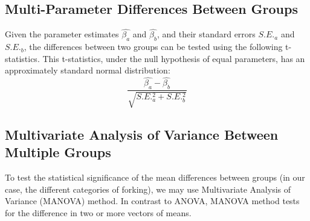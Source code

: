 \documentclass[12pt,letterpaper]{gthesis2}  %
\begin{document}
\subsection*{Multi-Parameter Differences Between Groups}
\label{multiParameterTest}
Given the parameter estimates $\hat{\beta_a}$ and $\hat{\beta_b}$, and their standard errors $S.E._a$ and $S.E._b$, the differences between two groups can be tested using the following t-statistics. This t-statistics, under the null hypothesis of equal parameters, has an approximately standard normal distribution:
\begin{equation}
\frac{\hat{\beta_a}-\hat{\beta_b}}{\sqrt{S.E._a^2 + S.E._b^2}}
\end{equation}

\subsection*{Multivariate Analysis of Variance Between Multiple Groups}
\label{MANOVA}
To test the statistical significance of the mean differences between groups (in our case, the different categories of forking), we may use Multivariate Analysis of Variance (MANOVA) method. In contrast to ANOVA, MANOVA method tests for the difference in two or more vectors of means.\\
\end{document}
